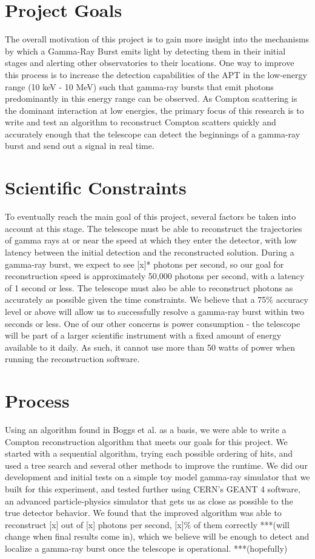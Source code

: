 \section{Project Goals}
The overall motivation of this project is to gain more insight into the mechanisms by which a Gamma-Ray Burst emits light by detecting them in their initial stages and alerting other observatories to their locations. One way to improve this process is to increase the detection capabilities of the APT in the low-energy range (10 keV - 10 MeV) such that gamma-ray bursts that emit photons predominantly in this energy range can be observed. As Compton scattering is the dominant interaction at low energies, the primary focus of this research is to write and test an algorithm to reconstruct Compton scatters quickly and accurately enough that the telescope can detect the beginnings of a gamma-ray burst and send out a signal in real time.

\section{Scientific Constraints}

To eventually reach the main goal of this project, several factors be taken into account at this stage. The telescope must be able to reconstruct the trajectories of gamma rays at or near the speed at which they enter the detector, with low latency between the initial detection and the reconstructed solution. During a gamma-ray burst, we expect to see [x]* photons per second, so our goal for reconstruction speed is approximately 50,000 photons per second, with a latency of 1 second or less. The telescope must also be able to reconstruct photons as accurately as possible given the time constraints. We believe that a 75\% accuracy level or above will allow us to successfully resolve a gamma-ray burst within two seconds or less. One of our other concerns is power consumption - the telescope will be part of a larger scientific instrument with a fixed amount of energy available to it daily. As such, it cannot use more than 50 watts of power when running the reconstruction software.

\section{Process}
Using an algorithm found in Boggs et al. \cite{Boggs} as a basis, we were able to write a Compton reconstruction algorithm that meets our goals for this project. We started with a sequential algorithm, trying each possible ordering of hits, and used a tree search and several other methods to improve the runtime. We did our development and initial tests on a simple toy model gamma-ray simulator that we built for this experiment, and tested further using CERN's GEANT 4 software, an advanced particle-physics simulator that gets us as close as possible to the true detector behavior. We found that the improved algorithm was able to reconstruct [x] out of [x] photons per second, [x]\% of them correctly ***(will change when final results come in), which we believe will be enough to detect and localize a gamma-ray burst once the telescope is operational. ***(hopefully)

